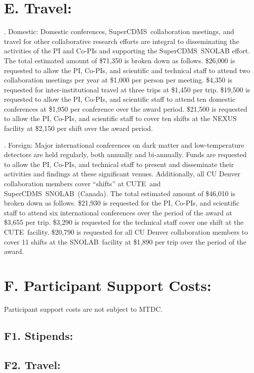 \documentclass[11pt]{article}
\def\ni{\noindent}
\def\ss{\smallskip}
\def\ms{\medskip}
\newcommand{\SNOLAB}{{\small SNOLAB}}
\newcommand{\CUTE}{{\small CUTE}}
\newcommand{\SuperCDMS}{{\small SuperCDMS}}
\begin{document}
\section*{E. Travel: }

\ms
\ni 1. Domestic:  Domestic conferences, \SuperCDMS\ collaboration meetings, and travel for other collaborative research efforts are integral to disseminating the activities of the PI and Co-PIs and supporting the \SuperCDMS\ SNOLAB effort. The total estimated amount of \$71,350 is broken down as follows. \$26,000 is requested to allow the PI, Co-PIs, and scientific and technical staff to attend two collaboration meetings per year at \$1,000 per person per meeting. \$4,350 is requested for inter-institutional travel at three trips at \$1,450 per trip. \$19,500 is requested to allow the PI, Co-PIs, and scientific staff to attend ten domestic conferences at \$1,950 per conference over the award period. \$21,500 is requested to allow the PI, Co-PIs, and scientific staff to cover ten shifts at the NEXUS facility at \$2,150 per shift over the award period.


\ss
\ni 2. Foreign: Major international conferences on dark matter and low-temperature detectors are held regularly, both annually and bi-annually. Funds are requested to allow the PI, Co-PIs, and technical staff to present and disseminate their activities and findings at these significant venues. Additionally, all CU Denver collaboration members cover ``shifts'' at \CUTE\ and \SuperCDMS\ \SNOLAB\ (Canada). The total estimated amount of \$46,010 is broken down as follows. \$21,930 is requested for the PI, Co-PIs, and scientific staff to attend six international conferences over the period of the award at \$3,655 per trip. \$3,290 is requested for the technical staff cover one shift at the \CUTE\ facility. \$20,790 is requested for all CU Denver collaboration members to cover 11 shifts at the \SNOLAB\ facility at \$1,890 per trip over the period of the award.

\section*{F. Participant Support Costs:} 
Participant support costs are not subject to MTDC.

\subsection*{F1. Stipends:}

\subsection*{F2. Travel:}
\end{document}
